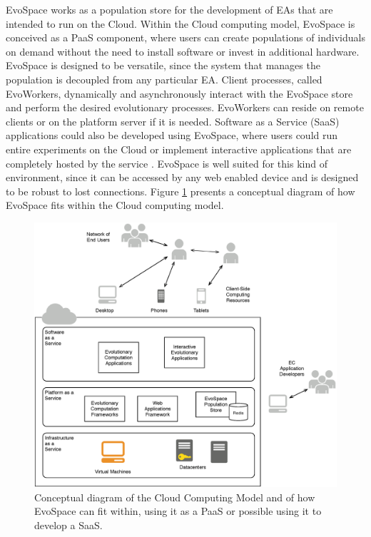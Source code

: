 EvoSpace works as a population store for the development of EAs that are intended to run on the Cloud.
Within the Cloud computing model, EvoSpace is conceived as a PaaS component, where users can create populations of individuals on demand
without the need to install software or invest in additional
hardware. %
EvoSpace is designed to be versatile, since the system that manages
the population is decoupled from any particular EA. %
Client processes, called EvoWorkers, dynamically and asynchronously interact with the EvoSpace store and perform the desired evolutionary processes.
EvoWorkers can reside on remote clients or on the platform server if
it is needed. %
Software as a Service (SaaS) applications could also be developed using EvoSpace, where users could run entire experiments on the
Cloud or implement interactive applications that are completely hosted by the service \cite{cloud}.
EvoSpace is well suited for this kind of environment, since it can be accessed by any web enabled device and is designed to be robust to lost connections.
Figure \ref{fig:cloud} presents a conceptual diagram of how EvoSpace fits within the Cloud computing model.

\begin{figure}[t]
    \centering
        \includegraphics[width=12cm]{cloud2.eps}
    \caption{Conceptual diagram of the Cloud Computing Model and of how EvoSpace can fit within, using it as a PaaS or possible using it to develop a SaaS.}
    \label{fig:cloud} %
\end{figure}


